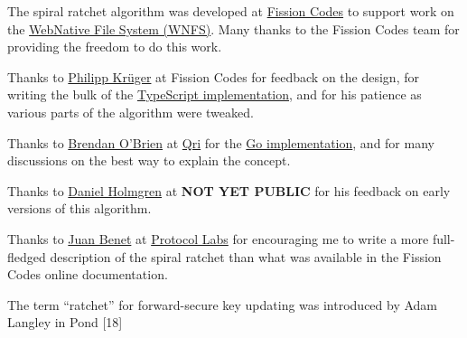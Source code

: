 \documentclass{article}
\begin{document}
    The spiral ratchet algorithm was developed at \href{https://fission.codes}{Fission Codes} to support work on the \href{https://github.com/fission-suite/webnative}{WebNative File System (WNFS)}. Many thanks to the Fission Codes team for providing the freedom to do this work.
    
    Thanks to \href{https://github.com/matheus23/}{Philipp Krüger} at Fission Codes for  feedback on the design, for writing the bulk of the \href{https://github.com/fission-suite/webnative/blob/e1eed4e750c668a6f54d9be701dc17e286b9eff4/src/fs/data/private/spiralratchet.ts}{TypeScript implementation}, and for his patience as various parts of the algorithm were tweaked.
    
    Thanks to \href{https://github.com/b5/}{Brendan O'Brien} at \href{https://qri.io/}{Qri} for the \href{https://github.com/qri-io/wnfs-go/blob/62915924c866f7106aecacccd14e57bd1b62850f/private/ratchet/ratchet.go}{Go implementation}, and for many discussions on the best way to explain the concept.
    
    Thanks to \href{https://github.com/dholms}{Daniel Holmgren} at \textbf{NOT YET PUBLIC} for his feedback on early versions of this algorithm.
    
    Thanks to \href{https://github.com/jbenet/}{Juan Benet} at \href{https://protocol.ai/}{Protocol Labs} for encouraging me to write a more full-fledged description of the spiral ratchet than what was available in the Fission Codes online documentation.
    
    The term “ratchet” for forward-secure key updating was introduced by Adam Langley in Pond [18]
    
    
\end{document}
